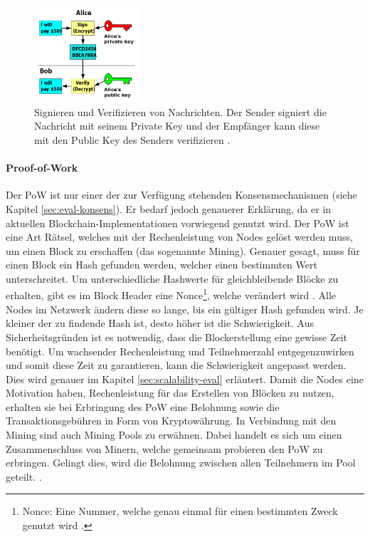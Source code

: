 \begin{figure}[!htbp]
	\centering
	  \includegraphics[width=0.35\textwidth,angle=0]{images/key-signing}
	  \caption{Signieren und Verifizieren von Nachrichten. Der Sender signiert die Nachricht mit seinem Private Key und der Empfänger kann diese mit den Public Key des Senders verifizieren \cite{WikimediaCommonsPublickeysigning2006}.}
	  \label{fig:key-signing}
\end{figure}
	
\paragraph{Proof-of-Work}
Der \acs{PoW} ist nur einer der zur Verfügung stehenden Konsensmechanismen (siehe Kapitel \ref{sec:eval-konsens}). Er bedarf jedoch genauerer Erklärung, da er in aktuellen Blockchain-Implementationen vorwiegend genutzt wird. Der \acs{PoW} ist eine Art Rätsel, welches mit der Rechenleistung von Nodes gelöst werden muss, um einen Block zu erschaffen (das sogenannte Mining). Genauer gesagt, muss für einen Block ein Hash gefunden werden, welcher einen bestimmten Wert unterschreitet. Um unterschiedliche Hashwerte für gleichbleibende Blöcke zu erhalten, gibt es im Block Header eine Nonce\footnote{Nonce: Eine Nummer, welche genau einmal für einen bestimmten Zweck genutzt wird \cite{MargaretNonceDefinition}.}, welche verändert wird \cite{NakamotoBitcoinPeertoPeerElectronic2008}. Alle Nodes im Netzwerk ändern diese so lange, bis ein gültiger Hash gefunden wird. Je kleiner der zu findende Hash ist, desto höher ist die Schwierigkeit. Aus Sicherheitsgründen ist es notwendig, dass die Blockerstellung eine gewisse Zeit benötigt. Um wachsender Rechenleistung und Teilnehmerzahl entgegenzuwirken und somit diese Zeit zu garantieren, kann die Schwierigkeit angepasst werden. Dies wird genauer im Kapitel \ref{sec:scalability-eval} erläutert. Damit die Nodes eine Motivation haben, Rechenleistung für das Erstellen von Blöcken zu nutzen, erhalten sie bei Erbringung des \acs{PoW} eine Belohnung sowie die Transaktionsgebühren in Form von Kryptowährung. In Verbindung mit den Mining sind auch Mining Pools zu erwähnen. Dabei handelt es sich um einen Zusammenschluss von Minern, welche gemeinsam probieren den \acs{PoW} zu erbringen. Gelingt dies, wird die Belohnung zwischen allen Teilnehmern im Pool geteilt.  \cite{NakamotoBitcoinPeertoPeerElectronic2008} \cite{EthereumTeamEthereumWhitePaper2017}. 

